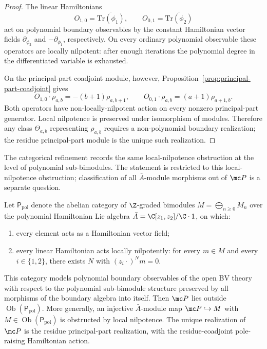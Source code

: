 \documentclass[11pt]{memoir}
\begin{document}
\begin{proof}
  The linear Hamiltonians
  $$O_{1,0}=\overline{\mathrm{Tr}(\phi_1)},\qquad
    O_{0,1}=\overline{\mathrm{Tr}(\phi_2)}$$
  act on polynomial boundary observables by the constant Hamiltonian vector
  fields $\partial_{\phi_2}$ and $-\partial_{\phi_1}$, respectively. On every
  ordinary polynomial observable these operators are locally nilpotent: after
  enough iterations the polynomial degree in the differentiated variable is
  exhausted.

  On the principal-part coadjoint module, however,
  Proposition~\ref{prop:principal-part-coadjoint} gives
  $$O_{1,0}\cdot\rho_{a,b}=-(b+1)\rho_{a,b+1},\qquad
    O_{0,1}\cdot\rho_{a,b}=(a+1)\rho_{a+1,b}.$$
  Both operators have non-locally-nilpotent action on every nonzero
  principal-part generator. Local nilpotence is preserved under isomorphism of modules.
  Therefore any class \(\Theta_{a,b}\) representing \(\rho_{a,b}\)
  requires a non-polynomial boundary
  realization; the residue principal-part module is the unique such
  realization.
\end{proof}

The categorical refinement records the same local-nilpotence obstruction
at the level of polynomial sub-bimodules.  The statement is restricted to
this local-nilpotence obstruction; classification of all
\(\bar A\)-module morphisms out of \(\mc P\) is a separate question.

\begin{thm}\label{thm:polynomial-realization-categorical-obstruction}
  Let $\mathsf P_{\mathrm{pol}}$ denote the abelian category of
  $\Z$-graded bimodules $M=\bigoplus_{n\ge0}M_n$ over the polynomial
  Hamiltonian Lie algebra $\bar A=\C[z_1,z_2]/\C\cdot1$, on which:
  \begin{enumerate}
    \item every element acts as a Hamiltonian vector field;
    \item every linear Hamiltonian acts locally nilpotently: for every
      $m\in M$ and every $i\in\{1,2\}$, there exists $N$ with
      $(z_i\cdot)^N m=0$.
  \end{enumerate}
  This category models polynomial boundary observables of the open BV
  theory with respect to the polynomial sub-bimodule structure preserved
  by all morphisms of the boundary algebra into itself. Then
  \(\mc P\) lies outside
  \(\operatorname{Ob}(\mathsf P_{\mathrm{pol}})\).  More
  generally, an injective \(\bar A\)-module map
  \(\mc P\hookrightarrow M\) with
  \(M\in\operatorname{Ob}(\mathsf P_{\mathrm{pol}})\) is obstructed by
  local nilpotence.  The unique
  realization of \(\mc P\) is the residue principal-part realization,
  with the residue-coadjoint pole-raising Hamiltonian action.
\end{thm}
\end{document}
